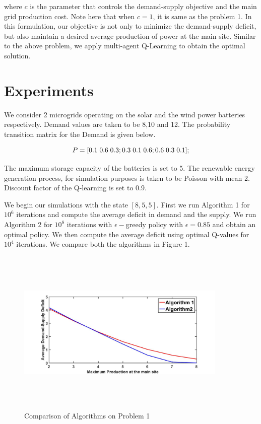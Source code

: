 \documentclass[conference]{IEEEtran}
\begin{document}
where $c$ is the parameter that controls the demand-supply objective and the main grid production cost. Note here that when $c =1$, it is same as the problem 1. In this formulation, our objective is not only to minimize the demand-supply deficit, but also maintain a desired average production of power at the main site. Similar to the above problem, we apply multi-agent Q-Learning to obtain the optimal solution. 

\section{Experiments}
We consider 2 microgrids operating on the solar and the wind power batteries respectively. Demand values are taken to be 8,10 and 12. The probability transition matrix for the Demand is given below. 

$$ P = [0.1\hspace{0.1cm}0.6\hspace{0.1cm} 0.3; 0.3\hspace{0.1cm} 0.1\hspace{0.1cm} 0.6; 0.6 \hspace{0.1cm}0.3 \hspace{0.1cm}0.1];$$

The maximum storage capacity of the batteries is set to 5. The renewable energy generation process, for simulation purposes is taken to be Poisson with mean 2. Discount factor of the Q-learning is set to 0.9.

We begin our simulations with the state $[8,5,5]$. First we run Algorithm 1 for $10^6$ iterations and compute the average deficit in demand and the supply. We run Algorithm 2 for $10^8$ iterations with $\epsilon-$greedy policy with $\epsilon = 0.85$ and obtain an optimal policy. We then compute the average deficit using optimal Q-values for $10^4$ iterations. We compare both the algorithms in Figure 1.

\begin{figure}[h!]
\begin{center}
 \includegraphics[width = 10cm, height = 8cm]{plot1.jpg}
 \caption{Comparison of Algorithms on Problem 1}
 \end{center}
 \end{figure}
\end{document}
